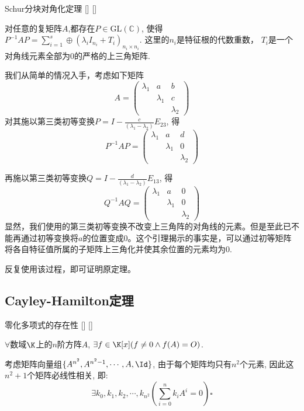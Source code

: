 \documentclass[UTF8]{ctexart}
\begin{document}
		\begin{thm}
			[]
			{Schur分块对角化定理}
			[]
			[]

			对任意的复矩阵$A$,都存在$P\in\text{GL}(\mathbb{C})$, 使得 $P^{-1}AP=\sum_{i=1}^{s}\oplus (\lambda_iI_{n_i}+T_i)_{n_i\times n_i}$. 这里的$n_i$是特征根的代数重数， $T_i$是一个对角线元素全部为0的严格的上三角矩阵.
		\end{thm}

		\begin{prf}
			我们从简单的情况入手，考虑如下矩阵\[A=
			\begin{pmatrix}
				\lambda_1&a&b\\ &\lambda_1&c\\ &&\lambda_2
			\end{pmatrix}\]
			对其施以第三类初等变换$P=I-\displaystyle\frac{c}{(\lambda_1-\lambda_2)}E_{23} $, 得
			\[P^{-1}AP=
			\begin{pmatrix}
				\lambda_1&a&d\\ &\lambda_1&0\\ &&\lambda_2
			\end{pmatrix}\]
			
			再施以第三类初等变换$Q=I-\displaystyle\frac{d}{(\lambda_1-\lambda_2)}E_{13} $, 得
			\[Q^{-1}AQ=
			\begin{pmatrix}
				\lambda_1&a&0\\ &\lambda_1&0\\ &&\lambda_2
			\end{pmatrix}\]
			显然，我们使用的第三类初等变换不改变上三角阵的对角线的元素。但是至此已不能再通过初等变换将$a$的位置变成0。这个引理揭示的事实是，可以通过初等矩阵将各自特征值所属的子矩阵上三角化并使其余位置的元素均为0.

			反复使用该过程，即可证明原定理。
		\end{prf}
	
	\subsection{Cayley-Hamilton定理}
	
		
		\begin{thm}
			[]
			{零化多项式的存在性}
			[]
			[]

			$\forall$数域$\K$上的$n$阶方阵$A$, $\exists f\in\K[x](f\neq 0\wedge f(A)=O)$. 
		\end{thm}

		\begin{prf}

			考虑矩阵向量组$\{A^{n^2}, A^{n^2-1}, \cdots ,A,\Id\}$, 由于每个矩阵均只有$n^2$个元素, 因此这$n^2+1$个矩阵必线性相关, 即: 
			\[\exists k_0,k_1,k_2,\cdots,k_{n^2}(\sum_{i=0}^n k_i A^i=0)\square\]
		\end{prf}
		
\end{document}
